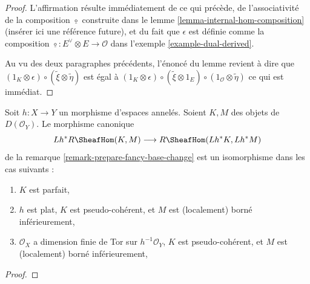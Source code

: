 {\begin{proof}
L'affirmation résulte immédiatement de ce qui précède, de l'associativité de la composition $\underline{\circ}$ construite dans le lemme \ref{lemma-internal-hom-composition} (insérer ici une référence future), et du fait que $\epsilon$
est définie comme la composition
$\underline{\circ} : E^\vee \otimes E \to \mathcal{O}$ dans l'exemple \ref{example-dual-derived}.

\medskip\noindent

Au vu des deux paragraphes précédents, l'énoncé du lemme revient à dire que
$(1_K \otimes \epsilon) \circ (\tilde \xi \otimes \tilde \eta)$
est égal à
$(1_K \otimes \epsilon) \circ (\tilde \xi \otimes 1_E)
\circ (1_\mathcal{O} \otimes \tilde \eta)$
ce qui est immédiat.

\end{proof}

\begin{lemma}

\label{lemma-pullback-internal-hom}

Soit $h : X \to Y$ un morphisme d'espaces annelés. Soient $K, M$ des objets de $D(\mathcal{O}_Y)$. Le morphisme canonique
$$
Lh^*R\SheafHom(K, M) \longrightarrow R\SheafHom(Lh^*K, Lh^*M)
$$
de la remarque \ref{remark-prepare-fancy-base-change}
est un isomorphisme dans les cas suivants :

\begin{enumerate}

\item  $K$ est parfait,
\item  $h$ est plat, $K$ est pseudo-cohérent, et $M$ est (localement) borné inférieurement,
\item  $\mathcal{O}_X$ a dimension finie de Tor sur $h^{-1}\mathcal{O}_Y$,
$K$ est pseudo-cohérent, et $M$ est (localement) borné inférieurement,

\end{enumerate}

\end{lemma}

\begin{proof}


\end{proof}}
